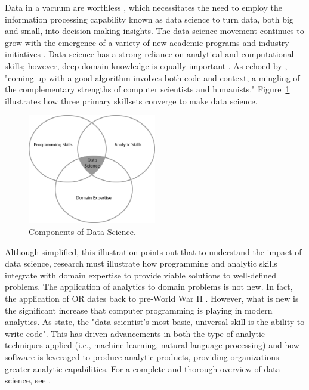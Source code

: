 \documentclass[twocolumn]{svjour3}       %
\begin{document}
Data in a vacuum are worthless \citep{gm15}, which necessitates the need to employ the information processing capability known as data science to turn data, both big and small, into decision-making insights. The data science movement continues to grow with the emergence of a variety of new academic programs and industry initiatives \citep{d15,ss15}. Data science has a strong reliance on analytical and computational skills; however, deep domain knowledge is equally important \citep{wf13}.  As echoed by \citet[p. 95]{smbdel15}, "coming up with a good algorithm involves both code and context, a mingling of the complementary strengths of computer scientists and humanists." Figure~\ref{fig:1} illustrates how three primary skillsets converge to make data science.

\begin{figure}[!htb]
  \includegraphics[width=0.5\textwidth]{venn-diagram.png}
  \caption{Components of Data Science.}
  \label{fig:1}
\end{figure}

Although simplified, this illustration points out that to understand the impact of data science, research must illustrate how programming and analytic skills integrate with domain expertise to provide viable solutions to well-defined problems. The application of analytics to domain problems is not new.  In fact, the application of OR dates back to pre-World War II \citep{l84}.  However, what is new is the significant increase that computer programming is playing in modern analytics.  As \citet[p. 74]{dp12} state, the "data scientist's most basic, universal skill is the ability to write code".  This has driven advancements in both the type of analytic techniques applied (i.e., machine learning, natural language processing) and how software is leveraged to produce analytic products, providing organizations greater analytic capabilities. For a complete and thorough overview of data science, see \citet{lc17}.
\end{document}
